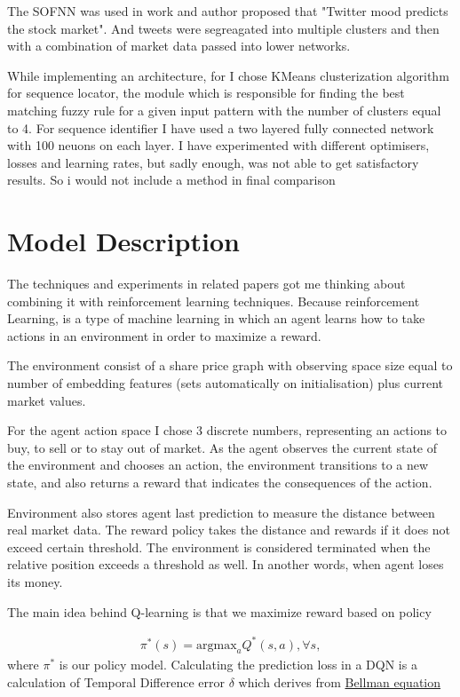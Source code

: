 \documentclass{article}
\begin{document}
The SOFNN was used in work \cite{BOLLEN20111} and author proposed that "Twitter mood predicts the stock market". And tweets were segreagated into multiple clusters and then with a combination of market data passed into lower networks.

While implementing an architecture, for I chose KMeans clusterization algorithm \cite{Hartigan1979} for sequence locator, the module which is responsible for finding the best matching fuzzy rule for a given input pattern with the number of clusters equal to 4. 
For sequence identifier I have used a two layered fully connected network with 100 neuons on each layer.
I have experimented with different optimisers, losses and learning rates, but sadly enough, was not able to get satisfactory results. So i would not include a method in final comparison


\section{Model Description}
The techniques and experiments in related papers got me thinking about combining it with reinforcement learning techniques.
Because reinforcement Learning, is a type of machine learning in which an agent learns how to take actions in an environment in order to maximize a reward.

The environment consist of a share price graph with observing space size equal to number of embedding features (sets automatically on initialisation) plus current market values.

For the agent action space I chose 3 discrete numbers, representing an actions to buy, to sell or to stay out of market.
As the agent observes the current state of the environment and chooses an action, the environment transitions to a new state, and also returns a reward that indicates the consequences of the action. 

Environment also stores agent last prediction to measure the distance between real market data.
The reward policy takes the distance and rewards if it does not exceed certain threshold.
The environment is considered terminated when the relative position exceeds a threshold as well. In another words, when agent loses its money.

The main idea behind Q-learning is that we maximize reward based on policy 

\begin{align}
\pi^*(s)  = \text{argmax}_a Q^*(s,a), \forall s,
\end{align}
where $\pi^*$ is our policy model. 
Calculating the prediction loss in a DQN is a calculation of Temporal Difference error $\delta$ which derives from \href{https://towardsdatascience.com/how-does-a-dqn-approximate-bellmans-equation-53e591d5e33}{Bellman equation}
\end{document}
